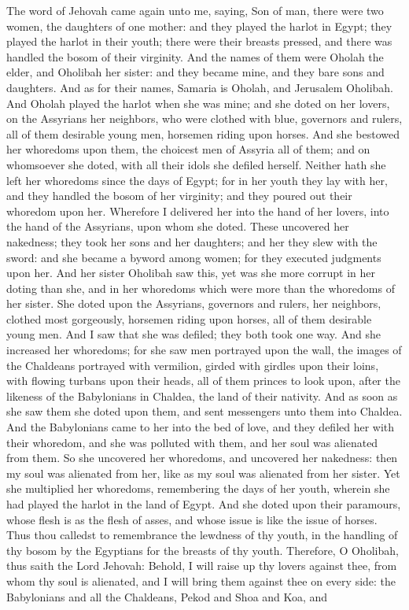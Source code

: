 The word of Jehovah came again unto me, saying, Son of man, there were two women, the daughters of one mother: and they played the harlot in Egypt; they played the harlot in their youth; there were their breasts pressed, and there was handled the bosom of their virginity. And the names of them were Oholah the elder, and Oholibah her sister: and they became mine, and they bare sons and daughters. And as for their names, Samaria is Oholah, and Jerusalem Oholibah.  And Oholah played the harlot when she was mine; and she doted on her lovers, on the Assyrians her neighbors, who were clothed with blue, governors and rulers, all of them desirable young men, horsemen riding upon horses. And she bestowed her whoredoms upon them, the choicest men of Assyria all of them; and on whomsoever she doted, with all their idols she defiled herself. Neither hath she left her whoredoms since the days of Egypt; for in her youth they lay with her, and they handled the bosom of her virginity; and they poured out their whoredom upon her. Wherefore I delivered her into the hand of her lovers, into the hand of the Assyrians, upon whom she doted. These uncovered her nakedness; they took her sons and her daughters; and her they slew with the sword: and she became a byword among women; for they executed judgments upon her.  And her sister Oholibah saw this, yet was she more corrupt in her doting than she, and in her whoredoms which were more than the whoredoms of her sister. She doted upon the Assyrians, governors and rulers, her neighbors, clothed most gorgeously, horsemen riding upon horses, all of them desirable young men. And I saw that she was defiled; they both took one way. And she increased her whoredoms; for she saw men portrayed upon the wall, the images of the Chaldeans portrayed with vermilion, girded with girdles upon their loins, with flowing turbans upon their heads, all of them princes to look upon, after the likeness of the Babylonians in Chaldea, the land of their nativity. And as soon as she saw them she doted upon them, and sent messengers unto them into Chaldea. And the Babylonians came to her into the bed of love, and they defiled her with their whoredom, and she was polluted with them, and her soul was alienated from them. So she uncovered her whoredoms, and uncovered her nakedness: then my soul was alienated from her, like as my soul was alienated from her sister. Yet she multiplied her whoredoms, remembering the days of her youth, wherein she had played the harlot in the land of Egypt. And she doted upon their paramours, whose flesh is as the flesh of asses, and whose issue is like the issue of horses. Thus thou calledst to remembrance the lewdness of thy youth, in the handling of thy bosom by the Egyptians for the breasts of thy youth.  Therefore, O Oholibah, thus saith the Lord Jehovah: Behold, I will raise up thy lovers against thee, from whom thy soul is alienated, and I will bring them against thee on every side: the Babylonians and all the Chaldeans, Pekod and Shoa and Koa, and 